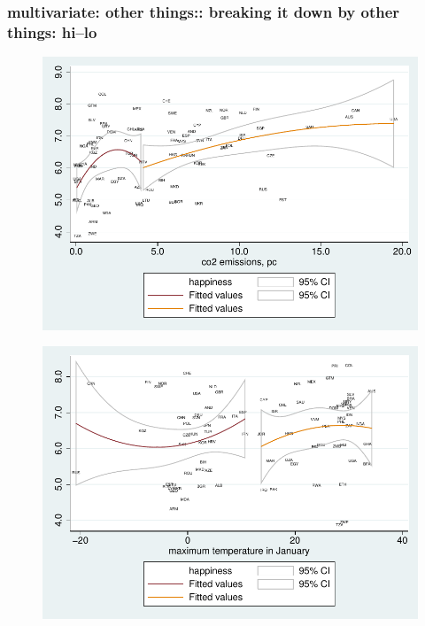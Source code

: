 \documentclass[10pt, letterpaper]{article}
\begin{document}
\begin{spacing}{1.4}
\subsubsection{multivariate: other things:: breaking it down by other things: hi--lo}

\begin{figure}[H]
 \includegraphics[width=6in]{graphsAndTables/co2twice.pdf}\centering
\caption{}\label{cenDivLsYrMGAPB}
 \end{figure}

\begin{figure}[H]
 \includegraphics[width=6in]{graphsAndTables/JanTwice.pdf}\centering
\caption{}\label{JanTwice}
 \end{figure}


\end{spacing}
\end{document}
